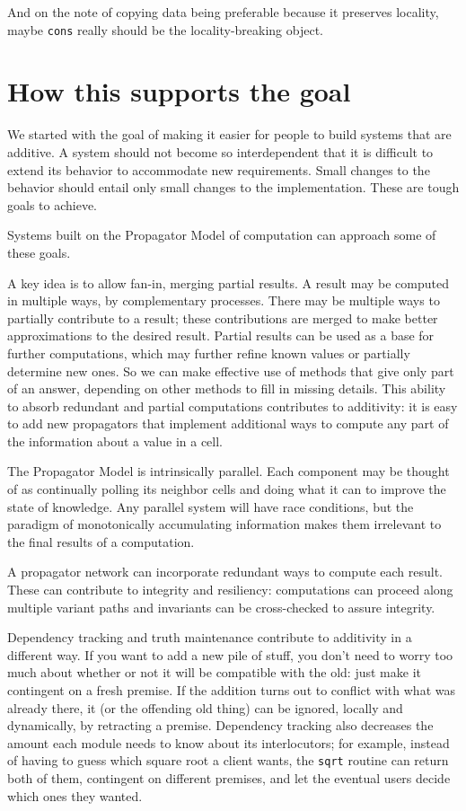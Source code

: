 \documentclass[12pt,letterpaper,english]{article}
\begin{document}
And on the note of copying data being preferable because it preserves
locality, maybe \texttt{cons} really should be the locality-breaking object.



\section{How this supports the goal}
\label{how-this-supports-the-goal}

We started with the goal of making it easier for people to build
systems that are additive.  A system should not become so
interdependent that it is difficult to extend its behavior to
accommodate new requirements.  Small changes to the behavior should
entail only small changes to the implementation.  These are tough
goals to achieve.

Systems built on the Propagator Model of computation can approach some
of these goals.

A key idea is to allow fan-in, merging partial results.  A result may
be computed in multiple ways, by complementary processes.  There may
be multiple ways to partially contribute to a result; these
contributions are merged to make better approximations to the desired
result.  Partial results can be used as a base for further
computations, which may further refine known values or partially
determine new ones.  So we can make effective use of methods that give
only part of an answer, depending on other methods to fill in missing
details.  This ability to absorb redundant and partial computations
contributes to additivity: it is easy to add new propagators that
implement additional ways to compute any part of the information about
a value in a cell.

The Propagator Model is intrinsically parallel.  Each component may be
thought of as continually polling its neighbor cells and doing what it
can to improve the state of knowledge.  Any parallel system will have
race conditions, but the paradigm of monotonically accumulating
information makes them irrelevant to the final results of a
computation.

A propagator network can incorporate redundant ways to compute each
result.  These can contribute to integrity and resiliency:
computations can proceed along multiple variant paths and invariants
can be cross-checked to assure integrity.

Dependency tracking and truth maintenance contribute to additivity in
a different way.  If you want to add a new pile of stuff, you don't
need to worry too much about whether or not it will be compatible with
the old: just make it contingent on a fresh premise.  If the addition
turns out to conflict with what was already there, it (or the
offending old thing) can be ignored, locally and dynamically, by
retracting a premise.  Dependency tracking also decreases the amount
each module needs to know about its interlocutors; for example,
instead of having to guess which square root a client wants, the
\texttt{sqrt} routine can return both of them, contingent on different
premises, and let the eventual users decide which ones they wanted.
\end{document}

